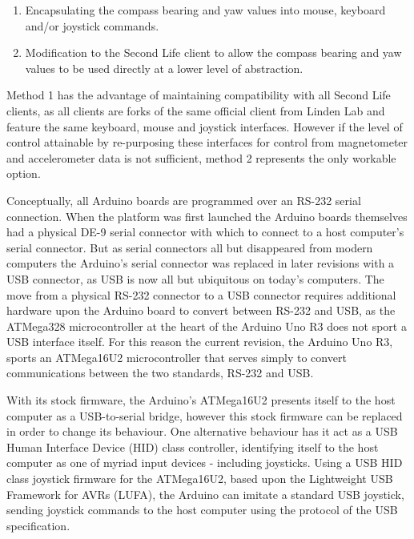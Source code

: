 \begin{enumerate}
	\item Encapsulating the compass bearing and yaw values into mouse, keyboard and/or joystick commands.
	\item Modification to the Second Life client to allow the compass bearing and yaw values to be used directly at a lower level of abstraction.
\end{enumerate}

Method 1 has the advantage of maintaining compatibility with all Second Life clients, as all clients are forks of the same official client from Linden Lab and feature the same keyboard, mouse and joystick interfaces. However if the level of control attainable by re-purposing these interfaces for control from magnetometer and accelerometer data is not sufficient, method 2 represents the only workable option.

Conceptually, all Arduino boards are programmed over an RS-232 serial connection. When the platform was first launched the Arduino boards themselves had a physical DE-9 serial connector with which to connect to a host computer's serial connector. But as serial connectors all but disappeared from modern computers the Arduino's serial connector was replaced in later revisions with a USB connector, as USB is now all but ubiquitous on today's computers. The move from a physical RS-232 connector to a USB connector requires additional hardware upon the Arduino board to convert between RS-232 and USB, as the ATMega328\atmegaTFootnote{} microcontroller at the heart of the Arduino Uno R3 does not sport a USB interface itself. For this reason the current revision, the Arduino Uno R3, sports an ATMega16U2\atmegaFootnote{} microcontroller that serves simply to convert communications between the two standards, RS-232 and USB.

With its stock firmware, the Arduino's ATMega16U2 presents itself to the host computer as a USB-to-serial bridge, however this stock firmware can be replaced in order to change its behaviour. One alternative behaviour has it act as a USB Human Interface Device (HID) class controller, identifying itself to the host computer as one of myriad input devices - including joysticks. Using a USB HID class joystick firmware for the ATMega16U2\arduinousbhidFootnote{}, based upon the Lightweight USB Framework for AVRs (LUFA)\lufaFootnote{}, the Arduino can imitate a standard USB joystick, sending joystick commands to the host computer using the protocol of the USB specification.

